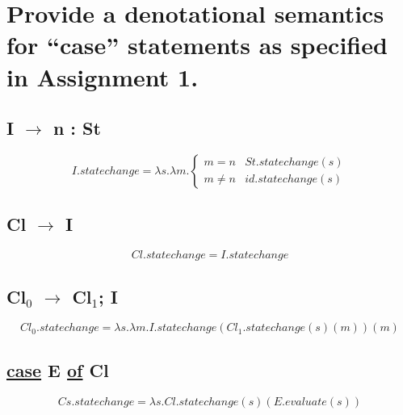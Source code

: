 \section{Provide a denotational semantics for ``case'' statements as specified in Assignment 1.}
\subsection{I $\rightarrow$ n : St}
\begin{equation}
	I.statechange = \lambda s. \lambda m. \left\{
		\begin{array}{rl}
			m = n		& St.statechange( s ) \\
			m \neq n	& id.statechange( s )
		\end{array} \right.
\end{equation}

\subsection{Cl $\rightarrow$ I}
\begin{equation}
	Cl.statechange = I.statechange
\end{equation}

\subsection{Cl$_0$ $\rightarrow$ Cl$_1$; I}
\begin{equation}
	Cl_0.statechange = \lambda s. \lambda m. I.statechange( Cl_1.statechange( s )( m ))( m )
\end{equation}

\subsection{\underline{case} E \underline{of} Cl}
\begin{equation}
	Cs.statechange = \lambda s. Cl.statechange( s )( E.evaluate( s ) )
\end{equation}